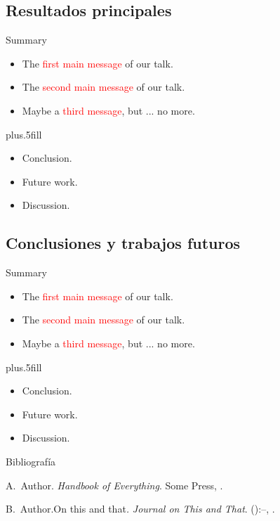 \documentclass{beamer}
\begin{document}
%
\subsection{Resultados principales}

\begin{frame}{Summary}
	\begin{itemize}
		\item The \textcolor{red}{first main message} of our talk.
		\item The \textcolor{red}{second main message} of our talk.
		\item Maybe a \textcolor{red}{third message}, but ... no more.
	\end{itemize}
	\vskip0pt plus.5fill
	\begin{itemize}
		\item Conclusion.
	\end{itemize}
	\begin{itemize}
		\item Future work.
		\item Discussion.
	\end{itemize}
\end{frame}

\subsection{Conclusiones y trabajos futuros}

\begin{frame}{Summary}
	\begin{itemize}
		\item The \textcolor{red}{first main message} of our talk.
		\item The \textcolor{red}{second main message} of our talk.
		\item Maybe a \textcolor{red}{third message}, but ... no more.
	\end{itemize}
	\vskip0pt plus.5fill
	\begin{itemize}
		\item Conclusion.
	\end{itemize}
	\begin{itemize}
		\item Future work.
		\item Discussion.
	\end{itemize}
\end{frame}

\begin{frame}{Bibliografía}
	\begin{thebibliography}{2}
		\beamertemplatebookbibitems
		A.\ Author. \newblock\emph{Handbook of Everything}.\newblock
\textlatin{Some Press, }.

		\beamertemplatearticlebibitems
		B.\ Author.\newblock On this and that\emph{.}
\newblock\emph{Journal on This and That}. 
():--, 
.
	\end{thebibliography}
\end{frame}

\end{document}
